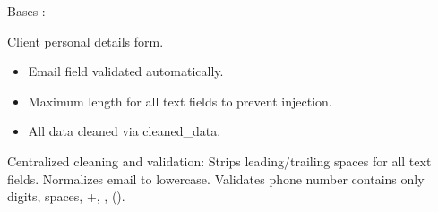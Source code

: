 \documentclass[letterpaper,10pt,french]{sphinxmanual}
\begin{document}
\begin{fulllineitems}
\label{\detokenize{index:bookings.forms.BookingDetailsForm}}
\pysigstartsignatures
\pysiglinewithargsret
{}
{\sphinxparamcomma {}\sphinxparamcomma {}\sphinxparamcomma {}\sphinxparamcomma {}\sphinxparamcomma {}\sphinxparamcomma {}\sphinxparamcomma {}\sphinxparamcomma {}\sphinxparamcomma {}\sphinxparamcomma {}\sphinxparamcomma {}}
{}
\pysigstopsignatures
\sphinxAtStartPar
Bases : 

\sphinxAtStartPar
Client personal details form.
\begin{description}
\begin{itemize}
\item {} 
\sphinxAtStartPar
Email field validated automatically.

\item {} 
\sphinxAtStartPar
Maximum length for all text fields to prevent injection.

\item {} 
\sphinxAtStartPar
All data cleaned via cleaned\_data.

\end{itemize}

\end{description}

\begin{fulllineitems}
\label{\detokenize{index:bookings.forms.BookingDetailsForm.clean}}
\pysigstartsignatures
\pysiglinewithargsret
{}
{}
{}
\pysigstopsignatures
\sphinxAtStartPar
Centralized cleaning and validation:
\sphinxhyphen{} Strips leading/trailing spaces for all text fields.
\sphinxhyphen{} Normalizes email to lowercase.
\sphinxhyphen{} Validates phone number contains only digits, spaces, +, \sphinxhyphen{}, ().


\end{fulllineitems}
\end{fulllineitems}
\end{document}
